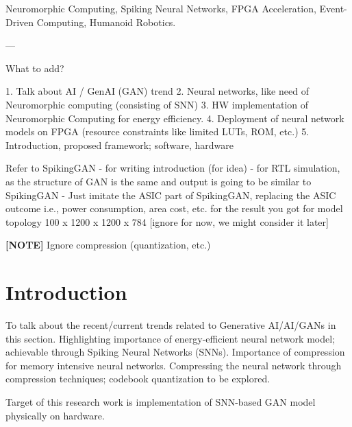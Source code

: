 \documentclass[conference]{IEEEtran}
\begin{document}
\begin{IEEEkeywords}
Neuromorphic Computing, Spiking Neural Networks, FPGA Acceleration, Event-Driven Computing, Humanoid Robotics.
\end{IEEEkeywords}

---

What to add?

1. Talk about AI / GenAI (GAN) trend
2. Neural networks, like need of Neuromorphic computing (consisting of SNN)
3. HW implementation of Neuromorphic Computing for energy efficiency.
4. Deployment of neural network models on FPGA (resource constraints like limited LUTs, ROM, etc.)
5. Introduction, proposed framework; software, hardware

Refer to SpikingGAN 
- for writing introduction (for idea)
- for RTL simulation, as the structure of GAN is the same and output is going to be similar to SpikingGAN
- Just imitate the ASIC part of SpikingGAN, replacing the ASIC outcome i.e., power consumption, area cost, etc. for the result you got for model topology 100 x 1200 x 1200 x 784 [ignore for now, we might consider it later]

\textbf{[NOTE]} Ignore compression (quantization, etc.)

%
\IEEEpeerreviewmaketitle

\section{Introduction}

To talk about the recent/current trends related to Generative AI/AI/GANs in this section. Highlighting importance of energy-efficient neural network model; achievable through Spiking Neural Networks (SNNs). Importance of compression~\cite{han2015deep_compression} for memory intensive neural networks. Compressing the neural network through compression techniques; codebook quantization to be explored.

Target of this research work is implementation of SNN-based GAN model physically on hardware. 
\end{document}
